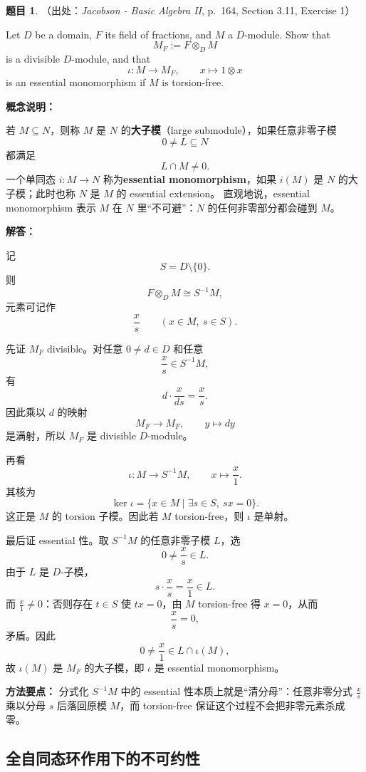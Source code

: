 \documentclass[a4paper]{ctexart}
\theoremstyle{definition}
\newtheorem{example}{题目}[section]
\theoremstyle{analysis}
\theoremstyle{plain}
\begin{document}
\begin{example}
（出处：\textit{Jacobson - Basic Algebra II}, p.~164, Section 3.11, Exercise 1）

Let \(D\) be a domain, \(F\) its field of fractions, and \(M\) a \(D\)-module. Show that
\[
  M_F:=F\otimes_D M
\]
is a divisible \(D\)-module, and that
\[
  \iota:M\longrightarrow M_F,\qquad x\longmapsto 1\otimes x
\]
is an essential monomorphism if \(M\) is torsion-free.

\textbf{概念说明：}

若 \(M\subseteq N\)，则称 \(M\) 是 \(N\) 的\textbf{大子模}（large submodule），如果任意非零子模
\[
  0\neq L\subseteq N
\]
都满足
\[
  L\cap M\neq 0.
\]
一个单同态 \(i:M\to N\) 称为\textbf{essential monomorphism}，如果 \(i(M)\) 是 \(N\) 的大子模；此时也称 \(N\) 是 \(M\) 的 essential extension。
直观地说，essential monomorphism 表示 \(M\) 在 \(N\) 里“不可避”：\(N\) 的任何非零部分都会碰到 \(M\)。

\textbf{解答：}

记
\[
  S=D\setminus\{0\}.
\]
则
\[
  F\otimes_D M\cong S^{-1}M,
\]
元素可记作
\[
  \frac{x}{s}\qquad (x\in M,\ s\in S).
\]

先证 \(M_F\) divisible。对任意 \(0\neq d\in D\) 和任意
\[
  \frac{x}{s}\in S^{-1}M,
\]
有
\[
  d\cdot \frac{x}{ds}=\frac{x}{s}.
\]
因此乘以 \(d\) 的映射
\[
  M_F\to M_F,\qquad y\mapsto dy
\]
是满射，所以 \(M_F\) 是 divisible \(D\)-module。

再看
\[
  \iota:M\to S^{-1}M,\qquad x\mapsto \frac{x}{1}.
\]
其核为
\[
  \ker\iota
  =
  \{x\in M\mid \exists s\in S,\ sx=0\}.
\]
这正是 \(M\) 的 torsion 子模。因此若 \(M\) torsion-free，则 \(\iota\) 是单射。

最后证 essential 性。取 \(S^{-1}M\) 的任意非零子模 \(L\)，选
\[
  0\neq \frac{x}{s}\in L.
\]
由于 \(L\) 是 \(D\)-子模，
\[
  s\cdot \frac{x}{s}=\frac{x}{1}\in L.
\]
而 \(\frac{x}{1}\neq 0\)：否则存在 \(t\in S\) 使 \(tx=0\)，由 \(M\) torsion-free 得 \(x=0\)，从而
\[
  \frac{x}{s}=0,
\]
矛盾。因此
\[
  0\neq \frac{x}{1}\in L\cap \iota(M),
\]
故 \(\iota(M)\) 是 \(M_F\) 的大子模，即 \(\iota\) 是 essential monomorphism。

\textbf{方法要点：}
分式化 \(S^{-1}M\) 中的 essential 性本质上就是“清分母”：任意非零分式 \(\frac{x}{s}\) 乘以分母 \(s\) 后落回原模 \(M\)，而 torsion-free 保证这个过程不会把非零元素杀成零。
\end{example}

\subsection{全自同态环作用下的不可约性}
\label{subsec:problem-endomorphism-ring-irreducible}
\end{document}
